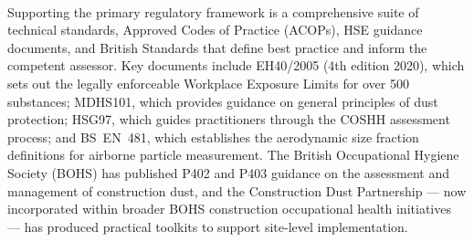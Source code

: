 \paragraph{}
Supporting the primary regulatory framework is a comprehensive suite of technical standards, Approved Codes of Practice (ACOPs), HSE guidance documents, and British Standards that define best practice and inform the competent assessor. Key documents include EH40/2005 (4th edition 2020), which sets out the legally enforceable Workplace Exposure Limits for over 500 substances; MDHS101, which provides guidance on general principles of dust protection; HSG97, which guides practitioners through the COSHH assessment process; and BS~EN~481, which establishes the aerodynamic size fraction definitions for airborne particle measurement. The British Occupational Hygiene Society (BOHS) has published P402 and P403 guidance on the assessment and management of construction dust, and the Construction Dust Partnership --- now incorporated within broader BOHS construction occupational health initiatives --- has produced practical toolkits to support site-level implementation.

